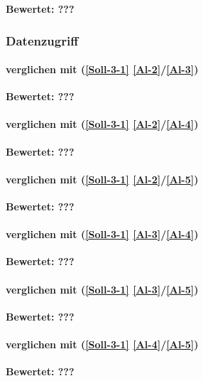 \textbf{Bewertet: ???}


\subsubsection{Datenzugriff}

\paragraph*{  verglichen mit  (\ref{Soll-3-1} \ref{Al-2}/\ref{Al-3})}

\textbf{Bewertet: ???}

\paragraph*{  verglichen mit  (\ref{Soll-3-1} \ref{Al-2}/\ref{Al-4})}

\textbf{Bewertet: ???}

\paragraph*{  verglichen mit  (\ref{Soll-3-1} \ref{Al-2}/\ref{Al-5})}

\textbf{Bewertet: ???}

\paragraph*{  verglichen mit  (\ref{Soll-3-1} \ref{Al-3}/\ref{Al-4})}

\textbf{Bewertet: ???}

\paragraph*{  verglichen mit  (\ref{Soll-3-1} \ref{Al-3}/\ref{Al-5})}

\textbf{Bewertet: ???}


\paragraph*{  verglichen mit  (\ref{Soll-3-1} \ref{Al-4}/\ref{Al-5})}

\textbf{Bewertet: ???}



